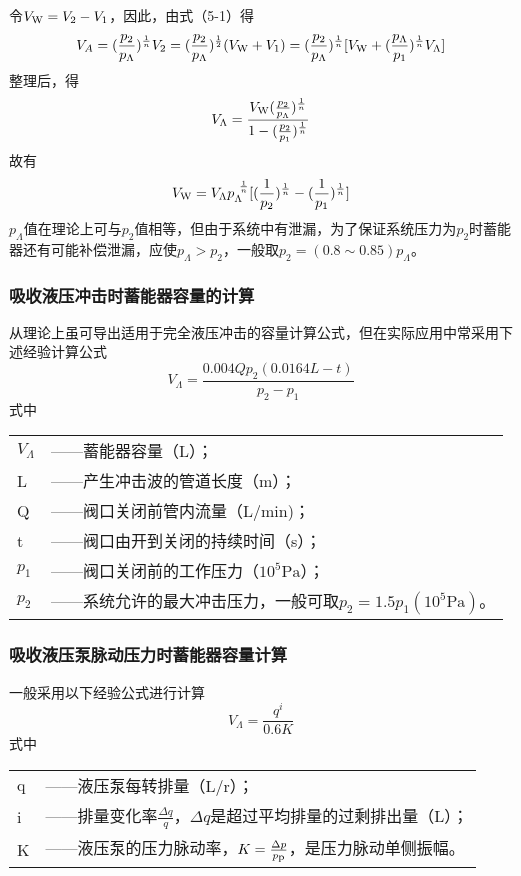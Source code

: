 令$V_{\mbox{\scriptsize W}}=V_{2}-V_{1}$，因此，由式（5-1）得
$$V_{A}=(\frac{p_{2}}{p_{\Lambda}})^{\frac{1}{n}}V_{2}=(\frac{p_{2}}{p_{\Lambda}})^{\frac{1}{2}}(V_{\mbox{\scriptsize W}}+V_{1})=(\frac{p_{2}}{p_{\Lambda}})^{\frac{1}{n}}[V_{\mbox{\scriptsize W}}+(\frac{p_{\Lambda}}{p_{1}})^{\frac{1}{n}}V_{\Lambda}]
$$
整理后，得
$$
V_{\Lambda}=\frac{V_{\mbox{\scriptsize W}}(\frac{p_{2}}{p_{\Lambda}})^{\frac{1}{n}}}{1-(\frac{p_{2}}{p_{1}})^{\frac{1}{n}}}
$$
故有
\begin{equation}
V_{\mbox{\scriptsize W}}=V_{\Lambda}p_{\Lambda}^{\ \frac{1}{n}}[(\frac{1}{p_{2}})^{\frac{1}{n}}-(\frac{1}{p_{1}})^{\frac{1}{n}}]
\end{equation}
$p_{\Lambda}$值在理论上可与$p_{2}$值相等，但由于系统中有泄漏，为了保证系统压力为$p_{2}$时蓄能器还有可能补偿泄漏，应使$p_{\Lambda}>p_{2}$，一般取$p_{2}=(0.8\sim0.85)p_{\Lambda}$。

\subsubsection{吸收液压冲击时蓄能器容量的计算}

从理论上虽可导出适用于完全液压冲击的容量计算公式，但在实际应用中常采用下述经验计算公式
\begin{equation}
V_{\Lambda}=\frac{0.004Qp_{2}(0.0164L-t)}{p_{2}-p_{1}}
\end{equation}
式中
\begin{tabular}[t]{ll}
$V_{\Lambda}$&——蓄能器容量（L）；\\
L&——产生冲击波的管道长度（m）；\\
Q&——阀口关闭前管内流量（L/min)；\\
t&——阀口由开到关闭的持续时间（s）；\\
$p_{1}$&——阀口关闭前的工作压力（$10^{5}\mbox{Pa}$）；\\
$p_{2}$&——系统允许的最大冲击压力，一般可取$p_{2}=1.5p_{1}(10^{5}\mbox{Pa})$。
\end{tabular}

\subsubsection{吸收液压泵脉动压力时蓄能器容量计算}

一般采用以下经验公式进行计算
\begin{equation}
V_{\Lambda}=\frac{q^{i}}{0.6K}
\end{equation}
式中
\begin{tabular}[t]{ll}
q&——液压泵每转排量（L/r）；\\
i&——排量变化率$\frac{\Delta{q}}{q}$，$\Delta{q}$是超过平均排量的过剩排出量（L）；\\
K&——液压泵的压力脉动率，$K=\frac{\Delta{p}}{p_{\mbox{\scriptsize p}}}$，是压力脉动单侧振幅。
\end{tabular}

